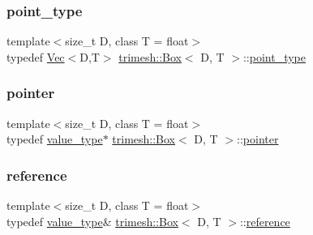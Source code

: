 \subsubsection{\texorpdfstring{point\+\_\+type}{point\_type}}
{\footnotesize\ttfamily template$<$size\+\_\+t D, class T = float$>$ \\
typedef \hyperlink{classtrimesh_1_1Vec}{Vec}$<$D,T$>$ \hyperlink{classtrimesh_1_1Box}{trimesh\+::\+Box}$<$ D, T $>$\+::\hyperlink{classtrimesh_1_1Box_a208c806781f96a7001491a275dfa7655}{point\+\_\+type}}

\mbox{\label{classtrimesh_1_1Box_a9047216c8a8bf0b23b12fbf08f1b4cb6}} 
\subsubsection{\texorpdfstring{pointer}{pointer}}
{\footnotesize\ttfamily template$<$size\+\_\+t D, class T = float$>$ \\
typedef \hyperlink{classtrimesh_1_1Box_aa78431130c7bda4a326f3a23da88ba82}{value\+\_\+type}$\ast$ \hyperlink{classtrimesh_1_1Box}{trimesh\+::\+Box}$<$ D, T $>$\+::\hyperlink{classtrimesh_1_1Box_a9047216c8a8bf0b23b12fbf08f1b4cb6}{pointer}}

\mbox{\label{classtrimesh_1_1Box_af56328ba73f0070abeeef8b1ae82a12d}} 
\subsubsection{\texorpdfstring{reference}{reference}}
{\footnotesize\ttfamily template$<$size\+\_\+t D, class T = float$>$ \\
typedef \hyperlink{classtrimesh_1_1Box_aa78431130c7bda4a326f3a23da88ba82}{value\+\_\+type}\& \hyperlink{classtrimesh_1_1Box}{trimesh\+::\+Box}$<$ D, T $>$\+::\hyperlink{classtrimesh_1_1Box_af56328ba73f0070abeeef8b1ae82a12d}{reference}}

\mbox{\label{classtrimesh_1_1Box_aa78431130c7bda4a326f3a23da88ba82}} 

